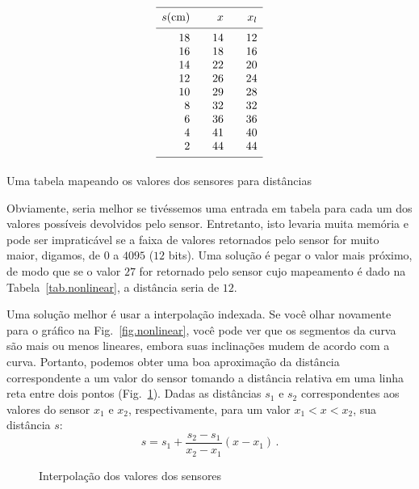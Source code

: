 {\begin{table}
\begin{displaymath}
\begin{array}{r@{\hspace{2em}}r@{\hspace{2em}}r}
\hline\noalign{\smallskip}
s \textrm{(cm)} & x & x_l\\
\noalign{\smallskip}\hline\noalign{\smallskip}
18 &14 & 12\\
16 &18 & 16\\
 14&22 & 20\\
 12&26 & 24\\
 10&29 & 28\\
 8 &32 & 32\\
 6 &36 & 36\\
 4 &41 & 40\\
 2 &44 & 44\\
\noalign{\smallskip}\hline\noalign{\smallskip}
\end{array}
\end{displaymath}
\caption{Uma tabela mapeando os valores dos sensores para distâncias}\label{tab.nonlinear}
\end{table}
Obviamente, seria melhor se tivéssemos uma entrada em tabela para cada um dos valores possíveis devolvidos pelo sensor. Entretanto, isto levaria muita memória e pode ser impraticável se a faixa de valores retornados pelo sensor for muito maior, digamos, de $0$ a $4095$ ($12$ bits). Uma solução é pegar o valor mais próximo, de modo que se o valor $27$ for retornado pelo sensor cujo mapeamento é dado na Tabela~\ref{tab.nonlinear}, a distância seria de $12$.

Uma solução melhor é usar a interpolação indexada. Se você olhar novamente para o gráfico na Fig.~\ref{fig.nonlinear}, você pode ver que os segmentos da curva são mais ou menos lineares, embora suas inclinações mudem de acordo com a curva. Portanto, podemos obter uma boa aproximação da distância correspondente a um valor do sensor tomando a distância relativa em uma linha reta entre dois pontos (Fig.~\ref{fig.interpolation}). Dadas as distâncias $s_1$ e $s_2$ correspondentes aos valores do sensor $x_1$ e $x_2$, respectivamente, para um valor $x_1<x<x_2$, sua distância $s$:
\[
s = s_1 + \frac{s_2-s_1}{x_2-x_1}(x-x_1)\,.
\]

\begin{figure}
\begin{center}
\caption{Interpolação dos valores dos sensores}\label{fig.interpolation}
\end{center}
\end{figure}

}

